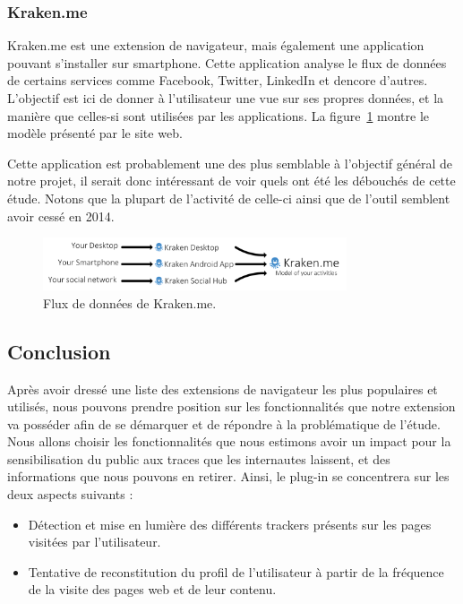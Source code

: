 		\subsubsection{Kraken.me}

			Kraken.me est une extension de navigateur, mais également une application pouvant s'installer sur smartphone. Cette application analyse le flux de données de certains services comme Facebook, Twitter, LinkedIn et dencore d'autres. L'objectif est ici de donner à l'utilisateur une vue sur ses propres données, et la manière que celles-si sont utilisées par les applications.
			La figure~\ref{a-krakenme} montre le modèle présenté par le site web.

			Cette application est probablement une des plus semblable à l'objectif général de notre projet, il serait donc intéressant de voir quels ont été les débouchés de cette étude. Notons que la plupart de l'activité de celle-ci ainsi que de l'outil semblent avoir cessé en 2014.

			\begin{figure}[h]
				\centering
				\includegraphics[width=0.8\textwidth]{images/analysis/krakenme}
				\caption{Flux de données de Kraken.me\cite{krakenme}.}
				\label{a-krakenme}
			\end{figure}

	\subsection{Conclusion}

		Après avoir dressé une liste des extensions de navigateur les plus populaires et utilisés, nous pouvons prendre position sur les fonctionnalités que notre extension va posséder afin de se démarquer et de répondre à la problématique de l'étude. Nous allons choisir les fonctionnalités que nous estimons avoir un impact pour la sensibilisation du public aux traces que les internautes laissent, et des informations que nous pouvons en retirer. Ainsi, le plug-in se concentrera sur les deux aspects suivants :

		\begin{itemize}
			\item Détection et mise en lumière des différents trackers présents sur les pages visitées par l'utilisateur.
			\item Tentative de reconstitution du profil de l'utilisateur à partir de la fréquence de la visite des pages web et de leur contenu.
		\end{itemize}

